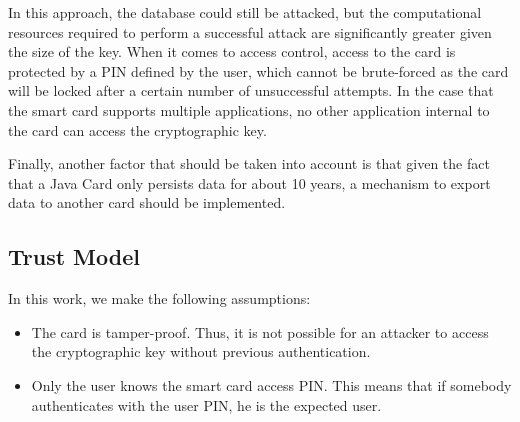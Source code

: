 \documentclass[a4paper, 11pt]{article}
\begin{document}
In this approach, the database could still be attacked, but the computational resources required to 
perform a successful attack are significantly greater given the size of the key. When it comes to 
access control, access to the card is protected by a PIN defined by the user, which cannot be 
brute-forced as the card will be locked after a certain number of unsuccessful attempts. In the 
case that the smart card supports multiple applications, no other application internal to the card 
can access the cryptographic key.

Finally, another factor that should be taken into account is that given the fact that a Java Card 
only persists data for about 10 years, a mechanism to export data to another card should be 
implemented.

\subsection{Trust Model}

In this work, we make the following assumptions:

\begin{itemize}
    \item The card is tamper-proof. Thus, it is not possible for an attacker to access the 
    cryptographic key without previous authentication.
    \item Only the user knows the smart card access PIN. This means that if somebody authenticates 
    with the user PIN, he is the expected user.
\end{itemize}

\pagebreak



\end{document}
